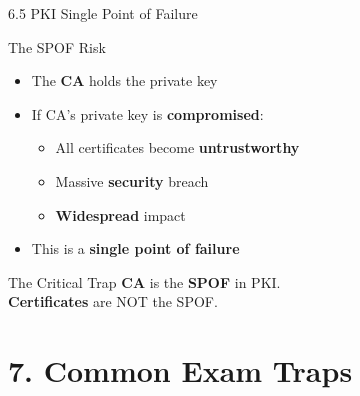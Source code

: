 \documentclass{beamer}
\begin{document}
	\begin{frame}{6.5 PKI Single Point of Failure}
		\begin{block}{The SPOF Risk}
			\begin{itemize}
				\item The \textbf{CA} holds the private key
				\item If CA's private key is \textbf{compromised}:
				\begin{itemize}
					\item All certificates become \textbf{untrustworthy}
					\item Massive \textbf{security} breach
					\item \textbf{Widespread} impact
				\end{itemize}
				\item This is a \textbf{single point of failure}
			\end{itemize}
		\end{block}
		
		\begin{alertblock}{The Critical Trap}
			\textbf{CA} is the \textbf{SPOF} in PKI. \\
			\textbf{Certificates} are NOT the SPOF.
		\end{alertblock}
	\end{frame}
	
	\section{7. Common Exam Traps}
	
\end{document}

